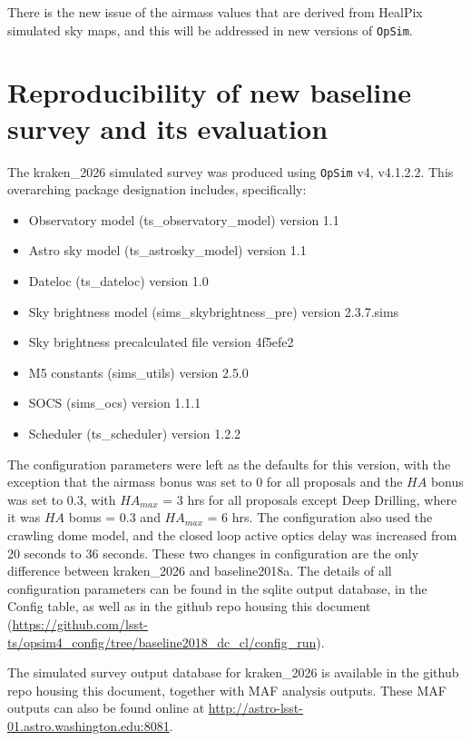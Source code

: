 \documentclass[DM,lsstdraft,authoryear,toc]{lsstdoc}
\newcommand{\opsim}{\texttt{OpSim}\xspace}
\begin{document}
There is the new issue of the airmass values that are derived from HealPix simulated sky maps, and this will be addressed
in new versions of \opsim. 

\section{Reproducibility of new baseline survey and its evaluation}

The kraken\_2026  simulated survey was produced using \opsim v4, v4.1.2.2.  This overarching package designation includes, specifically:
\begin{itemize}
\item Observatory model (ts\_observatory\_model) version 1.1
\item Astro sky model (ts\_astrosky\_model) version 1.1
\item Dateloc (ts\_dateloc) version 1.0
\item Sky brightness model (sims\_skybrightness\_pre) version 2.3.7.sims
\item Sky brightness precalculated file version 4f5efe2
\item M5 constants (sims\_utils) version 2.5.0 
\item SOCS (sims\_ocs) version 1.1.1
\item Scheduler (ts\_scheduler) version 1.2.2
\end{itemize}

The configuration parameters were left as the defaults for this version, with the exception that the airmass bonus was set to 0 for all proposals and the $HA$ bonus was set to 0.3, with $HA_{max}$ = 3 hrs 
for all proposals except Deep Drilling, where it was $HA$ bonus = 0.3 and $HA_{max}$ = 6 hrs. The configuration also used the 
crawling dome model, and the closed loop active optics delay was increased from 20 seconds to 36 seconds.
These two changes in configuration are the only difference between kraken\_2026 and baseline2018a.
The details of all configuration parameters can be found in the sqlite output database, in the Config table, as well as in the 
github repo housing this document (\url{https://github.com/lsst-ts/opsim4_config/tree/baseline2018_dc_cl/config_run}).

The simulated survey output database for kraken\_2026 is available in the github repo housing this document, together with MAF analysis outputs. 
These MAF outputs can also be found online at \url{http://astro-lsst-01.astro.washington.edu:8081}.

\end{document}
